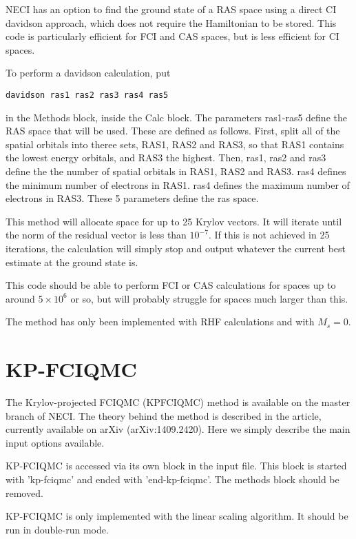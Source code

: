 \documentclass[a4paper,notitlepage]{scrreprt}
\begin{document}
    NECI has an option to find the ground state of a RAS space using a
    direct CI davidson approach, which does not require the Hamiltonian to be
    stored. This code is particularly efficient for FCI and CAS spaces, but is
    less efficient for CI spaces.

    To perform a davidson calculation, put
    \begin{lstlisting}[gobble=4]
    	davidson ras1 ras2 ras3 ras4 ras5
    \end{lstlisting}
    in the Methods block, inside the Calc block. The parameters ras1-ras5 define
    the RAS space that will be used. These are defined as follows. First,
    split all of the spatial orbitals into theree sets, RAS1, RAS2 and RAS3,
    so that RAS1 contains the lowest energy orbitals, and RAS3 the highest.
    Then, ras1, ras2 and ras3 define the the number of spatial orbitals in
    RAS1, RAS2 and RAS3. ras4 defines the minimum number of electrons in RAS1.
    ras4 defines the maximum number of electrons in RAS3. These 5 parameters
    define the ras space.

    This method will allocate space for up to 25 Krylov vectors. It will iterate
    until the norm of the residual vector is less than $10^{-7}$. If this is
    not achieved in 25 iterations, the calculation will simply stop and output
    whatever the current best estimate at the ground state is.

    This code should be able to perform FCI or CAS calculations for spaces up
    to around $5\times10^6$ or so, but will probably struggle for spaces much
    larger than this.

    The method has only been implemented with RHF calculations and with $M_s=0$.

\section{KP-FCIQMC}

    The Krylov-projected FCIQMC (KPFCIQMC) method is available on the master
    branch of NECI. The theory behind the method is described in the article,
    currently available on arXiv (arXiv:1409.2420). Here we simply describe the
    main input options available.

    KP-FCIQMC is accessed via its own block in the input file. This block is
    started with 'kp-fciqmc' and ended with 'end-kp-fciqmc'. The methods block
    should be removed.

    KP-FCIQMC is only implemented with the linear scaling algorithm. It should
    be run in double-run mode.
\end{document}

